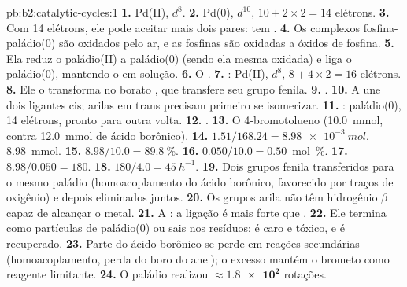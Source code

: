 \begin{solution}{pb:b2:catalytic-cycles:1}
\textbf{1.} Pd(II), $d^8$.
\textbf{2.} Pd(0), $d^{10}$, $10 + 2 \times 2 = 14$ elétrons.
\textbf{3.} Com 14 elétrons, ele pode aceitar mais dois pares: tem .
\textbf{4.} Os complexos fosfina-paládio(0) são oxidados pelo ar, e as fosfinas
são oxidadas a óxidos de fosfina.
\textbf{5.} Ela reduz o paládio(II) a paládio(0) (sendo ela mesma oxidada) e
liga o paládio(0), mantendo-o em solução.
\textbf{6.} O .
\textbf{7.} : Pd(II), $d^8$, $8 + 4 \times 2 =
16$ elétrons.
\textbf{8.} Ele o transforma no borato , que transfere seu grupo fenila.
\textbf{9.} .
\textbf{10.} A  une dois ligantes cis; arilas em trans precisam
primeiro se isomerizar.
\textbf{11.} : paládio(0), 14 elétrons, pronto
para outra volta.
\textbf{12.} .
\textbf{13.} O 4-bromotolueno (\qty{10.0}{mmol}, contra \qty{12.0}{mmol} de ácido borônico).
\textbf{14.} $1.51/168.24 = \qty{8.98e-3}{mol}$, \qty{8.98}{mmol}.
\textbf{15.} $8.98/10.0 = 89.8~\%$.
\textbf{16.} $0.050/10.0 = 0.50$~mol~\%.
\textbf{17.} $8.98/0.050 = 180$.
\textbf{18.} $180/4.0 = \qty{45}{h^{-1}}$.
\textbf{19.} Dois grupos fenila transferidos para o mesmo paládio
(homoacoplamento do ácido borônico, favorecido por traços de oxigênio) e
depois eliminados juntos.
\textbf{20.} Os grupos arila não têm hidrogênio $\beta$ capaz de alcançar o metal.
\textbf{21.} A : a ligação  é mais forte que .
\textbf{22.} Ele termina como partículas de paládio(0) ou sais nos resíduos; é
caro e tóxico, e é recuperado.
\textbf{23.} Parte do ácido borônico se perde em reações secundárias
(homoacoplamento, perda do boro do anel); o excesso mantém o brometo como
reagente limitante.
\textbf{24.} O paládio realizou $\boldsymbol{\approx \num{1.8e2}}$ rotações.
\end{solution}
